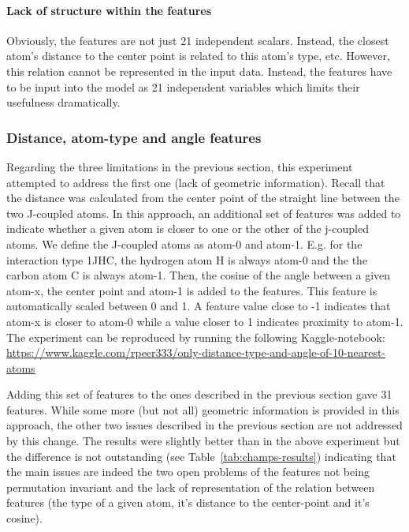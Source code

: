 \paragraph{Lack of structure within the features} Obviously, the features are not just 21 independent scalars. Instead, the closest atom's distance to the center point is related to this atom's type, etc. However, this relation cannot be represented in the input data. Instead, the features have to be input into the model as 21 independent variables which limits their usefulness dramatically.


\subsubsection{Distance, atom-type and angle features}
\label{sec:dist-angle-atom-type}

Regarding the three limitations in the previous section, this experiment attempted to address the first one (lack of geometric information). Recall that the distance was calculated from the center point of the straight line between the two J-coupled atoms. In this approach, an additional set of features was added to indicate whether a given atom is closer to one or the other of the j-coupled atoms. We define the J-coupled atoms as atom-0 and atom-1. E.g. for the interaction type 1JHC, the hydrogen atom H is always atom-0 and the the carbon atom C is always atom-1. Then, the cosine of the angle between a given atom-x, the center point and atom-1 is added to the features. This feature is automatically scaled between 0 and 1. A feature value close to -1 indicates that atom-x is closer to atom-0 while a value closer to 1 indicates proximity to atom-1. The experiment can be reproduced by running the following Kaggle-notebook:~ \url{https://www.kaggle.com/rpeer333/only-distance-type-and-angle-of-10-nearest-atoms}

Adding this set of features to the ones described in the previous section gave 31 features. While some more (but not all) geometric information is provided in this approach, the other two issues described in the previous section are not addressed by this change. The results were slightly better than in the above experiment but the difference is not outstanding (see Table~\ref{tab:champs-results}) indicating that the main issues are indeed the two open problems of the features not being permutation invariant and the lack of representation of the relation between features (the type of a given atom, it's distance to the center-point and it's cosine).


